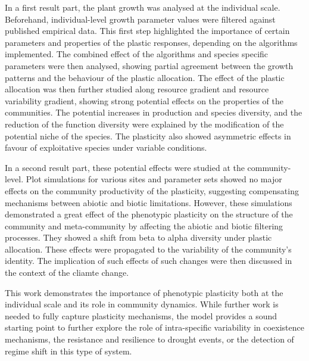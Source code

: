 \documentclass[a4paper, notoc, justified,marginals=left, nobib]{tufte-book}
\begin{document}
\begin{fullwidth}
In a first result part, the plant growth was analysed at the individual scale. Beforehand, individual-level growth parameter values were filtered against published empirical data. This first step highlighted the importance of certain parameters and properties of the plastic responses, depending on the algorithms implemented. The combined effect of the algorithms and species specific parameters were then analysed, showing partial agreement between the growth patterns and the behaviour of the plastic allocation. The effect of the plastic allocation was then further studied along resource gradient and resource variability gradient, showing strong potential effects on the properties of the communities. The potential increases in production and species diversity, and the reduction of the function diversity were explained by the modification of the potential niche of the species. The plasticity also showed asymmetric effects in favour of exploitative species under variable conditions.

In a second result part, these potential effects were studied at the community-level. Plot simulations for various sites and parameter sets showed no major effects on the community productivity of the plasticity, suggesting compensating mechanisms between abiotic and biotic limitations. However, these simulations demonstrated a great effect of the phenotypic plasticity on the structure of the community and meta-community by affecting the abiotic and biotic filtering processes. They showed a shift from beta to alpha diversity under plastic allocation. These effects were propagated to the variability of the community's identity. The implication of such effects of such changes were then discussed in the context of the cliamte change.




 This work demonstrates the importance of phenotypic plasticity both at the individual scale and its role in community dynamics. While further work is needed to fully capture plasticity mechanisms, the model provides a sound starting point to further explore the role of intra-specific variability in coexistence mechanisms, the resistance and resilience to drought events, or the detection of regime shift in this type of system.
\end{fullwidth}
\end{document}
